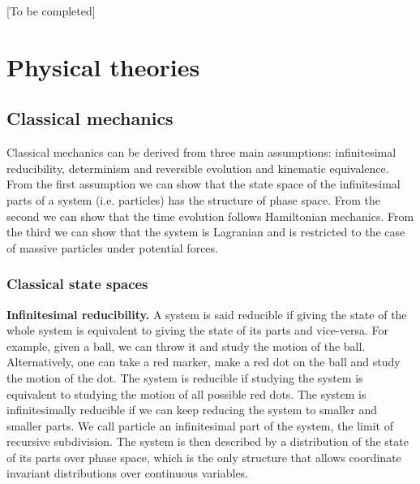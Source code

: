 \documentclass[twocolumn]{article}
\newif\ifextended
\newcommand\fact[2]{\ifextended \emph{#1}. #2 \fi}
\begin{document}
\fact{Determinism and reversibility is isomorphism}{TODO}

[To be completed]

\section{Physical theories}

\subsection{Classical mechanics}

Classical mechanics can be derived from three main assumptions: infinitesimal reducibility, determinism and reversible evolution and kinematic equivalence. From the first assumption we can show that the state space of the infinitesimal parts of a system (i.e. particles) has the structure of phase space. From the second we can show that the time evolution follows Hamiltonian mechanics. From the third we can show that the system is Lagranian and is restricted to the case of massive particles under potential forces.

\subsubsection{Classical state spaces}

\textbf{Infinitesimal reducibility.} A system is said reducible if giving the state of the whole system is equivalent to giving the state of its parts and vice-versa. For example, given a ball, we can throw it and study the motion of the ball. Alternatively, one can take a red marker, make a red dot on the ball and study the motion of the dot. The system is reducible if studying the system is equivalent to studying the motion of all possible red dots. The system is infinitesimally reducible if we can keep reducing the system to smaller and smaller parts. We call particle an infinitesimal part of the system, the limit of recursive subdivision. The system is then described by a distribution of the state of its parts over phase space, which is the only structure that allows coordinate invariant distributions over continuous variables.

\fact{Composite states are distributions over particle states} {Under infinitesimal reducibility, if $\mathcal{C}$ is the state space of the while system and $\mathcal{S}$ is the state space of the particles, then each state $c \in \mathcal{C}$ for the full system is identified by a distribution $\rho : \mathcal{S} \to \mathbb{R}$ over the states of infinitesimal parts. The function is real to signify that we can associate arbitrarily small amounts to each particle states. The distribution tells us how many particles can be found in each particle state.}
\end{document}
